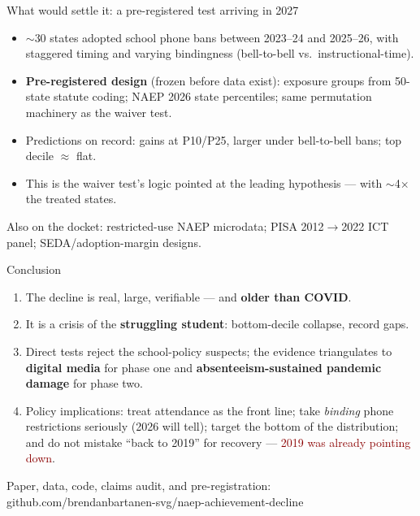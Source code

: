 \documentclass[11pt,aspectratio=169]{beamer}
\newcommand{\red}[1]{\textcolor{darkred}{#1}}
\newcommand{\gray}[1]{\textcolor{ltgray}{#1}}
\begin{document}
\begin{frame}{What would settle it: a pre-registered test arriving in 2027}
\begin{itemize}
\item $\sim$30 states adopted school phone bans between 2023--24 and 2025--26, with staggered timing and varying bindingness (bell-to-bell vs.\ instructional-time).
\item \textbf{Pre-registered design} (frozen before data exist): exposure groups from 50-state statute coding; NAEP 2026 state percentiles; same permutation machinery as the waiver test.
\item Predictions on record: gains at P10/P25, larger under bell-to-bell bans; top decile $\approx$ flat.
\item This is the waiver test's logic pointed at the leading hypothesis --- with $\sim$4$\times$ the treated states.
\end{itemize}
\vspace{4pt}
Also on the docket: restricted-use NAEP microdata; PISA 2012$\to$2022 ICT panel; SEDA/adoption-margin designs.
\end{frame}

\begin{frame}{Conclusion}
\begin{enumerate}
\item The decline is real, large, verifiable --- and \textbf{older than COVID}.
\item It is a crisis of the \textbf{struggling student}: bottom-decile collapse, record gaps.
\item Direct tests reject the school-policy suspects; the evidence triangulates to \textbf{digital media} for phase one and \textbf{absenteeism-sustained pandemic damage} for phase two.
\item Policy implications: treat attendance as the front line; take \emph{binding} phone restrictions seriously (2026 will tell); target the bottom of the distribution; and do not mistake ``back to 2019'' for recovery --- \red{2019 was already pointing down}.
\end{enumerate}
\vfill
\gray{\small Paper, data, code, claims audit, and pre-registration: github.com/brendanbartanen-svg/naep-achievement-decline}
\end{frame}
\end{document}
